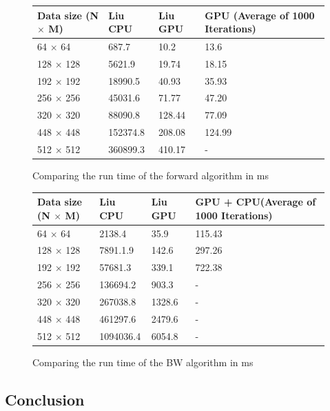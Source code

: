 \documentclass[english, paper=a4]{scrartcl}
\begin{document}
\begin{figure}[H]
\centering
\begin{tabular}{|l|l|l|l|}
\hline
Data size (N $\times$ M) & Liu CPU & Liu GPU & GPU (Average of 1000 Iterations)\\ \hline
64 $\times$ 64 & 687.7 & 10.2 & 13.6 \\ \hline
128 $\times$ 128 & 5621.9 & 19.74 & 18.15 \\ \hline
192 $\times$ 192 & 18990.5 & 40.93 & 35.93 \\ \hline
256 $\times$ 256 & 45031.6 & 71.77 & 47.20 \\ \hline
320 $\times$ 320 & 88090.8 & 128.44 & 77.09 \\ \hline
448 $\times$ 448 & 152374.8 & 208.08 & 124.99 \\ \hline
512 $\times$ 512 & 360899.3 & 410.17 & - \\ \hline

\end{tabular}

\caption{Comparing the run time of the forward algorithm in ms}
\end{figure}


\begin{figure}[H]
\centering
\begin{tabular}{|l|l|l|l|}
\hline
Data size (N $\times$ M) & Liu CPU & Liu GPU & GPU + CPU(Average of 1000 Iterations)\\ \hline
64 $\times$ 64 & 2138.4 & 35.9 & 115.43 \\ \hline
128 $\times$ 128 & 7891.1.9 & 142.6 & 297.26 \\ \hline
192 $\times$ 192 & 57681.3 & 339.1 & 722.38 \\ \hline
256 $\times$ 256 & 136694.2 & 903.3 & - \\ \hline
320 $\times$ 320 & 267038.8 & 1328.6 & - \\ \hline
448 $\times$ 448 & 461297.6 & 2479.6 & - \\ \hline
512 $\times$ 512 & 1094036.4 & 6054.8 & - \\ \hline

\end{tabular}

\caption{Comparing the run time of the BW algorithm in ms}
\end{figure}

\subsection{Conclusion}
\end{document}
